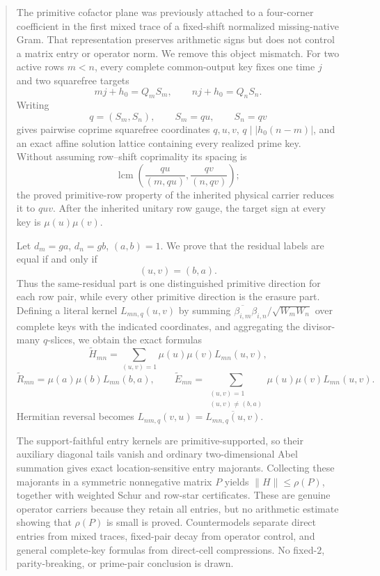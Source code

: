 \begin{abstract}
The primitive cofactor plane was previously attached to a four-corner
coefficient in the first mixed trace of a fixed-shift normalized
missing-native Gram.  That
representation preserves arithmetic signs but does not control a matrix
entry or operator norm.  We remove this object mismatch.  For two active
rows \(m<n\), every complete common-output key fixes one time \(j\) and two
squarefree targets
\[
 mj+h_0=Q_mS_m,\qquad nj+h_0=Q_nS_n.
\]
Writing
\[
 q=(S_m,S_n),\qquad S_m=qu,\qquad S_n=qv
\]
gives pairwise coprime squarefree coordinates \(q,u,v\),
\(q\mid |h_0(n-m)|\), and an exact affine solution lattice containing
every realized prime key.  Without assuming row--shift coprimality its
spacing is
\[
\operatorname{lcm}\left(\frac{qu}{(m,qu)},\frac{qv}{(n,qv)}\right);
\]
the proved primitive-row property of the inherited physical carrier
reduces it to \(quv\).
After the inherited unitary row gauge, the target sign at every key is
\(\mu(u)\mu(v)\).

Let \(d_m=ga\), \(d_n=gb\), \((a,b)=1\).  We prove that the residual labels
are equal if and only if
\[
 (u,v)=(b,a).
\]
Thus the same-residual part is one distinguished primitive direction for
each row pair, while every other primitive direction is the erasure part.
Defining a literal kernel \(L_{mn,q}(u,v)\) by summing
\(\overline{\beta_{i,m}}\beta_{i,n}/\sqrt{W_mW_n}\) over complete keys with
the indicated coordinates, and aggregating the divisor-many \(q\)-slices,
we obtain the exact formulas
\[
 \widetilde H_{mn}
 =\sum_{(u,v)=1}\mu(u)\mu(v)L_{mn}(u,v),
\]
\[
 \widetilde R_{mn}
 =\mu(a)\mu(b)L_{mn}(b,a),\qquad
 \widetilde E_{mn}
 =\sum_{\substack{(u,v)=1\\(u,v)\ne(b,a)}}
 \mu(u)\mu(v)L_{mn}(u,v).
\]
Hermitian reversal becomes
\(L_{nm,q}(v,u)=\overline{L_{mn,q}(u,v)}\).

The support-faithful entry kernels are primitive-supported, so their
auxiliary diagonal tails vanish and ordinary two-dimensional Abel
summation gives exact location-sensitive entry majorants.  Collecting
these majorants in a symmetric nonnegative matrix \(P\) yields
\(\|H\|\le\rho(P)\), together with weighted Schur and row-star
certificates.  These are genuine operator carriers because they retain
all entries, but no arithmetic estimate showing that \(\rho(P)\) is small
is proved.  Countermodels separate direct entries from mixed traces,
fixed-pair decay from operator control, and general complete-key formulas
from direct-cell compressions.  No fixed-\(2\), parity-breaking, or
prime-pair conclusion is drawn.
\end{abstract}

